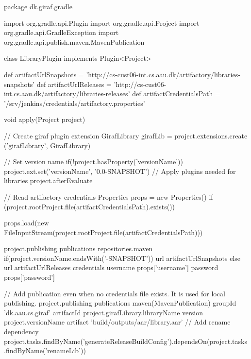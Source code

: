 \begin{gradlecode}[caption=Gradle Plugin to publish libraries,label=lst:gradle_plugin_library]
package dk.giraf.gradle

import org.gradle.api.Plugin
import org.gradle.api.Project
import org.gradle.api.GradleException
import org.gradle.api.publish.maven.MavenPublication

class LibraryPlugin implements Plugin<Project> {

    def artifactUrlSnapshots = 'http://cs-cust06-int.cs.aau.dk/artifactory/libraries-snapshots'
    def artifactUrlReleases = 'http://cs-cust06-int.cs.aau.dk/artifactory/libraries-releases'
    def artifactCredentialsPath = '/srv/jenkins/credentials/artifactory.properties'

    void apply(Project project) {
        // Create giraf plugin extension
        GirafLibrary girafLib = project.extensions.create ('girafLibrary', GirafLibrary)

        // Set version name
        if(!project.hasProperty('versionName')) {
            project.ext.set('versionName', '0.0-SNAPSHOT')
        }
        // Apply plugins needed for libraries
        project.afterEvaluate {
            // Read artifactory credentials
            Properties props = new Properties()
            if (project.rootProject.file(artifactCredentialsPath).exists()) {
                props.load(new FileInputStream(project.rootProject.file(artifactCredentialsPath)))

                project.publishing {
                    publications {
                        repositories.maven {
                            if(project.versionName.endsWith('-SNAPSHOT')) {
                                url artifactUrlSnapshots
                            } else {
                                url artifactUrlReleases
                            }
                            credentials {
                                username props['username']
                                password props['password']
                            }
                        }
                    }
                }
            }
            // Add publication even when no credentials file exists. It is used for local publishing.
            project.publishing {
                publications {
                    maven(MavenPublication) {
                        groupId 'dk.aau.cs.giraf'
                        artifactId project.girafLibrary.libraryName
                        version project.versionName
                        artifact 'build/outputs/aar/library.aar'
                    }
                }
            }
            // Add rename dependency
            project.tasks.findByName('generateReleaseBuildConfig').dependsOn(project.tasks.findByName('renameLib'))

}}}
\end{gradlecode}
